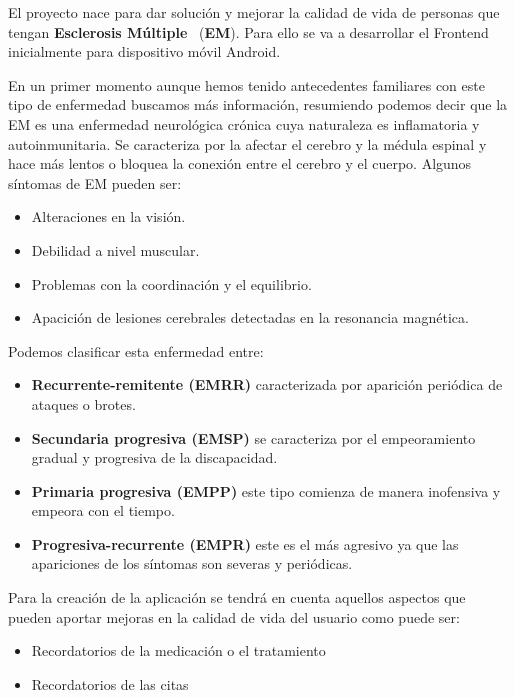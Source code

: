 
El proyecto nace para dar solución y mejorar la calidad de vida de personas que tengan \textbf{Esclerosis Múltiple}~\cite{wiki:em,medlineplus:em} (\textbf{EM}). Para ello se va a desarrollar el Frontend inicialmente para dispositivo móvil Android. 

En un primer momento aunque hemos tenido antecedentes familiares con este tipo de enfermedad buscamos más información, resumiendo podemos decir que la EM es una enfermedad neurológica crónica cuya naturaleza es inflamatoria y autoinmunitaria. Se caracteriza por la afectar el cerebro y la médula espinal y hace más lentos o bloquea la conexión entre el cerebro y el cuerpo.
Algunos síntomas de EM pueden ser:
\begin{itemize}
\item Alteraciones en la visión.
\item Debilidad a nivel muscular.
\item Problemas con la coordinación y el equilibrio.
\item Apacición de lesiones cerebrales detectadas en la resonancia magnética.
\end{itemize}
Podemos clasificar esta enfermedad entre:
\begin{itemize}
\item \textbf{Recurrente-remitente (EMRR)} caracterizada por aparición periódica de ataques o brotes.
\item \textbf{Secundaria progresiva (EMSP)} se caracteriza por el empeoramiento gradual y progresiva de la discapacidad.
\item \textbf{Primaria progresiva (EMPP)} este tipo comienza de manera inofensiva y empeora con el tiempo.
\item \textbf{Progresiva-recurrente (EMPR)} este es el más agresivo ya que las apariciones de los síntomas son severas y periódicas.
\end{itemize}

Para la creación de la aplicación se tendrá en cuenta aquellos aspectos que pueden aportar mejoras en la calidad de vida del usuario como puede ser:
\begin{itemize}
\item Recordatorios de la medicación o el tratamiento
\item Recordatorios de las citas
\end{itemize}



